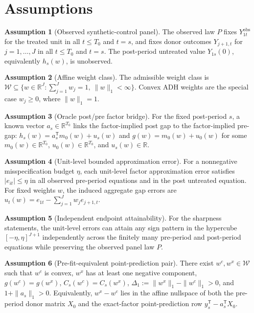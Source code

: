 \documentclass[11pt]{article}
\newcommand{\transpose}{\mathsf{T}}
\newcommand{\R}{\mathbb{R}}
\theoremstyle{definition}
\newtheorem{assumption}{Assumption}
\theoremstyle{plain}
\theoremstyle{remark}
\begin{document}
\section{Assumptions}
\begin{assumption}[Observed synthetic-control panel]\label{ass:panel}
The observed law \(P\) fixes \(Y^{\mathrm{obs}}_{1t}\) for the treated unit in all \(t\le T_0\) and \(t=s\), and fixes donor outcomes \(Y_{j+1,t}\) for \(j=1,\ldots,J\) in all \(t\le T_0\) and \(t=s\). The post-period untreated value \(Y_{1s}(0)\), equivalently \(h_s(w)\), is unobserved.
\end{assumption}

\begin{assumption}[Affine weight class]\label{ass:affine-weights}
The admissible weight class is \(\mathcal{W}\subseteq\{w\in\R^J:\sum_{j=1}^Jw_j=1,\ \|w\|_1<\infty\}\). Convex ADH weights are the special case \(w_j\ge0\), where \(\|w\|_1=1\).
\end{assumption}

\begin{assumption}[Oracle post/pre factor bridge]\label{ass:bridge}
For the fixed post-period \(s\), a known vector \(a_s\in\R^{T_0}\) links the factor-implied post gap to the factor-implied pre-gap: \(h_s(w)=a_s^\transpose m_0(w)+u_s(w)\) and \(g(w)=m_0(w)+u_0(w)\) for some \(m_0(w)\in\R^{T_0}\), \(u_0(w)\in\R^{T_0}\), and \(u_s(w)\in\R\).
\end{assumption}

\begin{assumption}[Unit-level bounded approximation error]\label{ass:unit-budget}
For a nonnegative misspecification budget \(\eta\), each unit-level factor approximation error satisfies \(|e_{it}|\le\eta\) in all observed pre-period equations and in the post untreated equation. For fixed weights \(w\), the induced aggregate gap errors are \(u_t(w)=e_{1t}-\sum_{j=1}^Jw_je_{j+1,t}\).
\end{assumption}

\begin{assumption}[Independent endpoint attainability]\label{ass:endpoint-attain}
For the sharpness statements, the unit-level errors can attain any sign pattern in the hypercube \([-\eta,\eta]^{J+1}\) independently across the finitely many pre-period and post-period equations while preserving the observed panel law \(P\).
\end{assumption}

\begin{assumption}[Pre-fit-equivalent point-prediction pair]\label{ass:prefit-pair}
There exist \(w^c,w^x\in\mathcal{W}\) such that \(w^c\) is convex, \(w^x\) has at least one negative component, \(g(w^c)=g(w^x)\), \(C_s(w^c)=C_s(w^x)\), \(\Delta_1:=\|w^x\|_1-\|w^c\|_1>0\), and \(1+\|a_s\|_1>0\). Equivalently, \(w^x-w^c\) lies in the affine nullspace of both the pre-period donor matrix \(X_0\) and the exact-factor point-prediction row \(y_s^\transpose-a_s^\transpose X_0\).
\end{assumption}
\end{document}

